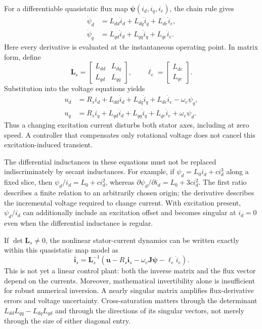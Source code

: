 For a differentiable quasistatic flux map $\bm\psi(i_d,i_q,i_e)$, the chain rule gives
\begin{align}
 \dot\psi_d&=L_{dd}\dot i_d+L_{dq}\dot i_q+L_{de}\dot i_e,\\
 \dot\psi_q&=L_{qd}\dot i_d+L_{qq}\dot i_q+L_{qe}\dot i_e.
 \label{eq:control-chain-components}
\end{align}
Here every derivative is evaluated at the instantaneous operating point. In matrix form, define
\begin{equation}
 \bm L_s=\begin{bmatrix}L_{dd}&L_{dq}\\L_{qd}&L_{qq}\end{bmatrix},
 \qquad
 \bm\ell_e=\begin{bmatrix}L_{de}\\L_{qe}\end{bmatrix}.
\end{equation}
Substitution into the voltage equations yields
\begin{align}
 u_d&=R_si_d+L_{dd}\dot i_d+L_{dq}\dot i_q
                 +L_{de}\dot i_e-\omega_e\psi_q,\\
 u_q&=R_si_q+L_{qd}\dot i_d+L_{qq}\dot i_q
                 +L_{qe}\dot i_e+\omega_e\psi_d.
 \label{eq:control-full-components}
\end{align}
Thus a changing excitation current disturbs both stator axes, including at zero speed. A controller that compensates only rotational voltage does not cancel this excitation-induced transient.

The differential inductances in these equations must not be replaced indiscriminately by secant inductances. For example, if $\psi_d=L_0i_d+c i_d^3$ along a fixed slice, then $\psi_d/i_d=L_0+c i_d^2$, whereas $\partial\psi_d/\partial i_d=L_0+3c i_d^2$. The first ratio describes a finite relation to an arbitrarily chosen origin; the derivative describes the incremental voltage required to change current. With excitation present, $\psi_d/i_d$ can additionally include an excitation offset and becomes singular at $i_d=0$ even when the differential inductance is regular.

If $\det\bm L_s\ne0$, the nonlinear stator-current dynamics can be written exactly within this quasistatic map model as
\begin{equation}
 \dot{\bm i_s}=\bm L_s^{-1}
 \left(\bm u-R_s\bm i_s-\omega_e\bm J\bm\psi
                    -\bm\ell_e\dot i_e\right).
 \label{eq:control-nonlinear-inverse}
\end{equation}
This is not yet a linear control plant: both the inverse matrix and the flux vector depend on the currents. Moreover, mathematical invertibility alone is insufficient for robust numerical inversion. A nearly singular matrix amplifies flux-derivative errors and voltage uncertainty. Cross-saturation matters through the determinant $L_{dd}L_{qq}-L_{dq}L_{qd}$ and through the directions of its singular vectors, not merely through the size of either diagonal entry.

